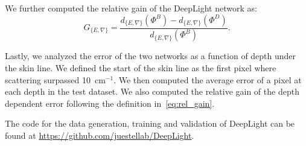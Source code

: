 \documentclass[journal,twoside,web]{ieeecolor}
\begin{document}
We further computed the relative gain of the DeepLight network as:
\begin{equation}
    G_{\{E, \nabla\}} = \frac{d_{\{E, \nabla\}}(\Phi^B) - d_{\{E, \nabla\}}(\Phi^D)}{d_{\{E, \nabla\}}(\Phi^B)}.
    \label{eq:rel_gain}
\end{equation}
\par
Lastly, we analyzed the error of the two networks as a function of depth under the skin line. %
We defined the start of the skin line as the first pixel where scattering surpassed 10~cm$^{-1}$. %
We then computed the average error of a pixel at each depth in the test dataset. %
We also computed the relative gain of the depth dependent error following the definition in~\eqref{eq:rel_gain}. %
\par
The code for the data generation, training and validation of DeepLight can be found at \url{https://github.com/juestellab/DeepLight}.
\end{document}
